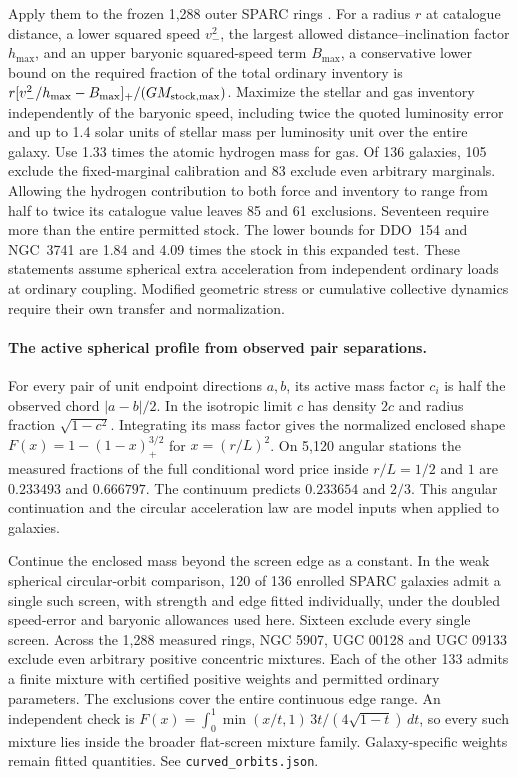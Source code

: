 \documentclass[11pt]{article}
\begin{document}
Apply them to the frozen 1,288 outer SPARC rings \cite{sparc2016}.
For a radius $r$ at catalogue distance, a lower squared speed $v_-^2$,
the largest allowed distance--inclination factor $h_{\max}$, and an
upper baryonic squared-speed term $B_{\max}$, a conservative lower
bound on the required fraction of the total ordinary inventory is
$r[v_-^2/h_{\max}-B_{\max}]_+/(G M_{\rm stock,max})$. Maximize
the stellar and gas inventory independently of the baryonic speed,
including twice the quoted luminosity error and up to 1.4 solar units
of stellar mass per luminosity unit over the entire galaxy. Use 1.33
times the atomic hydrogen mass for gas. Of 136 galaxies, 105 exclude
the fixed-marginal calibration and 83 exclude even arbitrary marginals.
Allowing the hydrogen contribution to both force and inventory to range
from half to twice its catalogue value leaves 85 and 61 exclusions.
Seventeen require more than the entire permitted stock. The
lower bounds for DDO~154 and NGC~3741 are 1.84 and 4.09 times the
stock in this expanded test. These statements assume spherical extra
acceleration from independent ordinary loads at ordinary coupling.
Modified geometric stress or cumulative collective dynamics require
their own transfer and normalization.

\paragraph{The active spherical profile from observed pair separations.}
For every pair of unit endpoint directions $a,b$, its active mass factor
$c_i$ is half the observed chord $|a-b|/2$. In the isotropic limit $c$
has density $2c$ and radius fraction $\sqrt{1-c^2}$. Integrating its
mass factor gives the normalized enclosed shape
$F(x)=1-(1-x)_+^{3/2}$ for $x=(r/L)^2$. On 5,120 angular stations the
measured fractions of the full conditional word price inside $r/L=1/2$
and $1$ are $0.233493$ and $0.666797$. The continuum predicts $0.233654$
and $2/3$. This angular continuation and the circular acceleration law
are model inputs when applied to galaxies.

Continue the enclosed mass beyond the screen edge as a constant. In the
weak spherical circular-orbit comparison, 120 of 136 enrolled SPARC
galaxies admit a single such screen, with strength and edge fitted
individually, under the doubled speed-error and baryonic allowances used
here. Sixteen exclude every single screen. Across the 1,288 measured rings,
NGC 5907, UGC 00128 and UGC 09133 exclude even arbitrary
positive concentric mixtures. Each of the other 133 admits a finite
mixture with certified positive weights and permitted ordinary parameters.
The exclusions cover the entire continuous edge range. An independent
check is $F(x)=\int_0^1\min(x/t,1)\,3t/(4\sqrt{1-t})\,dt$, so every such
mixture lies inside the broader flat-screen mixture family. Galaxy-specific
weights remain fitted quantities. See \texttt{curved\_orbits.json}.
\end{document}
